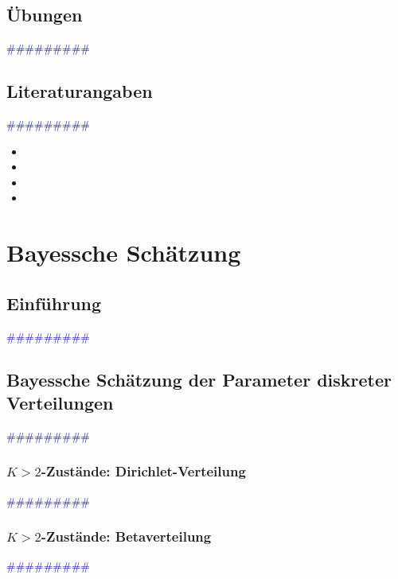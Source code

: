 \documentclass{article}
\begin{document}
  \subsection{Übungen} %
      \textcolor{blue}{\#\#\#\#\#\#\#\#\#}
  \subsection{Literaturangaben} %
      \textcolor{blue}{\#\#\#\#\#\#\#\#\#}

      \begin{itemize}
      \color{red}
        \item
        \item
      \color{ForestGreen}
        \item
        \item
      \end{itemize}




\newpage
\section{Bayessche Schätzung} %
  \subsection{Einführung} %
      \textcolor{blue}{\#\#\#\#\#\#\#\#\#}
  \subsection{Bayessche Schätzung der Parameter diskreter Verteilungen} %
      \textcolor{blue}{\#\#\#\#\#\#\#\#\#}
    \subsubsection{$K>2$-Zustände: Dirichlet-Verteilung} %
      \textcolor{blue}{\#\#\#\#\#\#\#\#\#}
    \subsubsection{$K>2$-Zustände: Betaverteilung} %
      \textcolor{blue}{\#\#\#\#\#\#\#\#\#}
\end{document}
